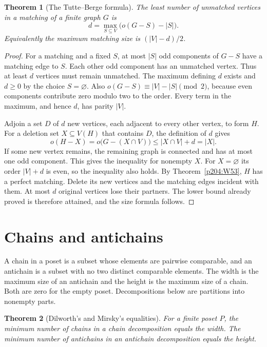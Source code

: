 \documentclass[11pt,oneside,openany]{book}
\theoremstyle{plain}
\newtheorem{theorem}{Theorem}[chapter]
\theoremstyle{definition}
\theoremstyle{remark}
\begin{document}
\begin{theorem}[The Tutte--Berge formula]\label{p204:W54}
The least number of unmatched vertices in a matching of a finite
graph \(G\) is
\[
 d=\max_{S\subseteq V}\bigl(o(G-S)-|S|\bigr).
\]
Equivalently the maximum matching size is \((|V|-d)/2\).
\end{theorem}

\begin{proof}
For a matching and a fixed \(S\), at most \(|S|\) odd components
of \(G-S\) have a matching edge to \(S\). Each other odd component
has an unmatched vertex. Thus at least \(d\) vertices must remain
unmatched. The maximum defining \(d\) exists and \(d\geq0\) by the
choice \(S=\varnothing\). Also \(o(G-S)\equiv |V|-|S|\pmod 2\),
because even components contribute zero modulo two to the order.
Every term in the maximum, and hence \(d\), has parity \(|V|\).

Adjoin a set \(D\) of \(d\) new vertices, each adjacent to every
other vertex, to form \(H\). For a deletion set \(X\subseteq V(H)\)
that contains \(D\), the definition of \(d\) gives
\[
 o(H-X)=o\bigl(G-(X\cap V)\bigr)\leq |X\cap V|+d=|X|.
\]
If some new vertex remains, the remaining graph is connected and
has at most one odd component. This gives the inequality for
nonempty \(X\). For \(X=\varnothing\) its order \(|V|+d\) is even,
so the inequality also holds. By Theorem~\ref{p204:W53}, \(H\)
has a perfect matching. Delete its new vertices and the matching
edges incident with them. At most \(d\) original vertices lose
their partners. The lower bound already proved is therefore
attained, and the size formula follows.
\end{proof}

\section{Chains and antichains}

A chain in a poset is a subset whose elements are pairwise comparable,
and an antichain is a subset with no two distinct comparable elements.
The width is the maximum size of an antichain and the height is the
maximum size of a chain. Both are zero for the empty poset.
Decompositions below are partitions into nonempty parts.

\begin{theorem}[Dilworth's and Mirsky's equalities]\label{p204:W55}
For a finite poset \(P\), the minimum number of chains in a chain
decomposition equals the width. The minimum number of antichains
in an antichain decomposition equals the height.
\end{theorem}
\end{document}
